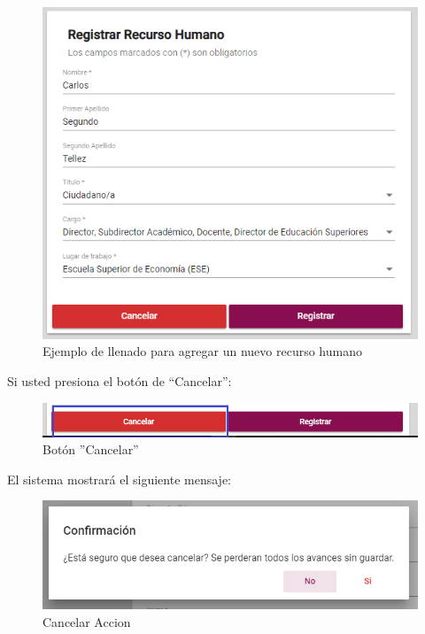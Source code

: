             \begin{figure}[!hbtp]
                \centering
                \hypertarget{ejreg}{\includegraphics[width=0.7\linewidth]{images/SP1/RegistrarLleno}}
                \caption{Ejemplo de llenado para agregar un nuevo recurso humano}
                \label{ejreg}
            \end{figure}
    
    \newpage
            Si usted presiona el botón de “Cancelar”: 
            
            \begin{figure}[!hbtp]
                \centering
                \hypertarget{cancel1}{\includegraphics[width=0.7\linewidth]{images/SP1/BtnCancelar1}}
                \caption{Botón ''Cancelar''}
                \label{cancel1}
            \end{figure}
            
            El sistema mostrará el siguiente mensaje:

            
             \begin{figure}[!hbtp]
                \centering
            \includegraphics[width=0.4\linewidth]{images/SP1/MSG29}
                \caption{Cancelar Accion}
                \label{mensaje29}
            \end{figure}    
        
